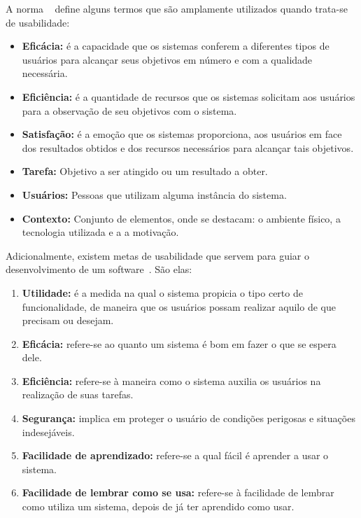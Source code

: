  A norma ~ define alguns termos que são amplamente utilizados quando trata-se de usabilidade:

\begin{itemize}
\item \textbf{Eficácia:} é a capacidade que os sistemas conferem a diferentes tipos de usuários para alcançar seus objetivos em número e com a qualidade necessária. 

\item \textbf{Eficiência:} é a quantidade de recursos que os sistemas solicitam aos usuários para a observação de seu objetivos com o sistema.

\item \textbf{Satisfação:} é a emoção que os sistemas proporciona, aos usuários em face dos resultados obtidos e dos recursos necessários para alcançar tais objetivos. 

\item \textbf{Tarefa:} Objetivo a ser atingido ou um resultado a obter.

\item \textbf{Usuários:} Pessoas que utilizam alguma instância do sistema.

\item \textbf{Contexto:} Conjunto de elementos, onde se destacam: o ambiente físico, a tecnologia utilizada e a a motivação.
\end{itemize}

Adicionalmente, existem metas de usabilidade que servem para guiar o desenvolvimento de um software~\cite{preece2007}. São elas:

\begin{enumerate}
	\item \textbf{Utilidade:} é a medida na qual o sistema propicia o tipo certo de funcionalidade, de maneira que os usuários possam realizar aquilo de que precisam ou desejam.
	\item \textbf{Eficácia:} refere-se ao quanto um sistema é bom em fazer o que se espera dele.
	\item \textbf{Eficiência:} refere-se à maneira como o sistema auxilia os usuários na realização de suas tarefas.
	\item \textbf{Segurança:} implica em proteger o usuário de condições perigosas e situações indesejáveis.
	\item \textbf{Facilidade de aprendizado:} refere-se a qual fácil é aprender a usar o sistema.
	\item \textbf{Facilidade de lembrar como se usa:} refere-se à facilidade de lembrar como utiliza um sistema, depois de já ter aprendido como usar.
\end{enumerate}

